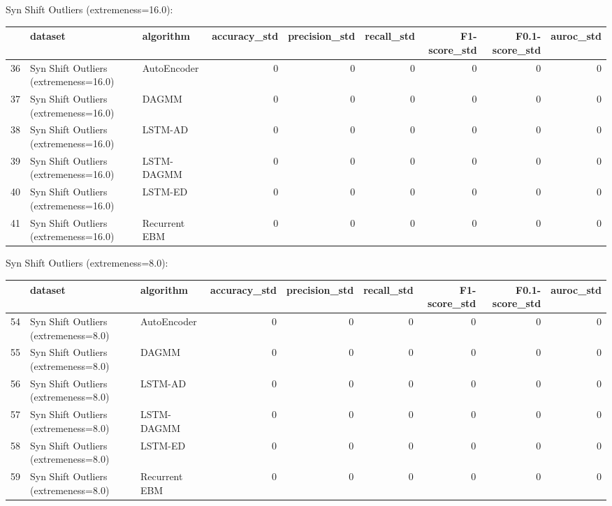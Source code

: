 Syn Shift Outliers (extremeness=16.0):

\begin{tabular}{rllrrrrrr}
\hline
    & dataset                               & algorithm     &   accuracy\_std &   precision\_std &   recall\_std &   F1-score\_std &   F0.1-score\_std &   auroc\_std \\
\hline
 36 & Syn Shift Outliers (extremeness=16.0) & AutoEncoder   &              0 &               0 &            0 &              0 &                0 &           0 \\
 37 & Syn Shift Outliers (extremeness=16.0) & DAGMM         &              0 &               0 &            0 &              0 &                0 &           0 \\
 38 & Syn Shift Outliers (extremeness=16.0) & LSTM-AD       &              0 &               0 &            0 &              0 &                0 &           0 \\
 39 & Syn Shift Outliers (extremeness=16.0) & LSTM-DAGMM    &              0 &               0 &            0 &              0 &                0 &           0 \\
 40 & Syn Shift Outliers (extremeness=16.0) & LSTM-ED       &              0 &               0 &            0 &              0 &                0 &           0 \\
 41 & Syn Shift Outliers (extremeness=16.0) & Recurrent EBM &              0 &               0 &            0 &              0 &                0 &           0 \\
\hline
\end{tabular}

Syn Shift Outliers (extremeness=8.0):

\begin{tabular}{rllrrrrrr}
\hline
    & dataset                              & algorithm     &   accuracy\_std &   precision\_std &   recall\_std &   F1-score\_std &   F0.1-score\_std &   auroc\_std \\
\hline
 54 & Syn Shift Outliers (extremeness=8.0) & AutoEncoder   &              0 &               0 &            0 &              0 &                0 &           0 \\
 55 & Syn Shift Outliers (extremeness=8.0) & DAGMM         &              0 &               0 &            0 &              0 &                0 &           0 \\
 56 & Syn Shift Outliers (extremeness=8.0) & LSTM-AD       &              0 &               0 &            0 &              0 &                0 &           0 \\
 57 & Syn Shift Outliers (extremeness=8.0) & LSTM-DAGMM    &              0 &               0 &            0 &              0 &                0 &           0 \\
 58 & Syn Shift Outliers (extremeness=8.0) & LSTM-ED       &              0 &               0 &            0 &              0 &                0 &           0 \\
 59 & Syn Shift Outliers (extremeness=8.0) & Recurrent EBM &              0 &               0 &            0 &              0 &                0 &           0 \\
\hline
\end{tabular}


